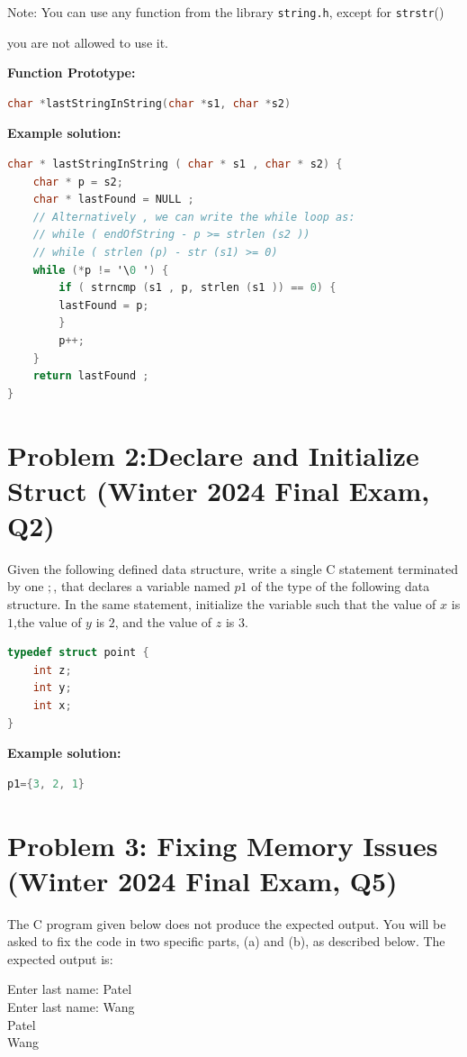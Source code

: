 \documentclass[12pt]{article}
\begin{document}
Note: You can use any function from the library \texttt{string.h}, except for \texttt{strstr}() { you are not allowed to use it.
	
	
\textbf{Function Prototype:}
\begin{lstlisting}[language=C]
char *lastStringInString(char *s1, char *s2) 
\end{lstlisting}
	

\textbf{Example solution:}
\begin{lstlisting}[language=C]
char * lastStringInString ( char * s1 , char * s2) {
	char * p = s2;
	char * lastFound = NULL ;
	// Alternatively , we can write the while loop as:
	// while ( endOfString - p >= strlen (s2 ))
	// while ( strlen (p) - str (s1) >= 0)
	while (*p != '\0 ') {
		if ( strncmp (s1 , p, strlen (s1 )) == 0) {
		lastFound = p;
		}
		p++;
	}
	return lastFound ;
}
\end{lstlisting}

\section*{Problem 2:Declare and Initialize Struct (Winter 2024  Final Exam, Q2)}
Given the following defined data structure, write a single C statement terminated by one $;$, that declares a variable named $p1$ of the type of the following data structure. In the same statement, initialize the variable such that the value of $x$ is $1$,the value of  $y$ is $2$, and the value of $z$ is $3$.

\begin{lstlisting}[language=C]
typedef struct point {
	int z;
	int y;
	int x;
}
\end{lstlisting}

\textbf{Example solution:}
\begin{lstlisting}[language=C]
p1={3, 2, 1}
\end{lstlisting}

\section*{Problem 3: Fixing Memory Issues (Winter 2024 Final Exam, Q5)}
The C program given below does not produce the expected output. You will be asked to fix the code in two specific parts, (a) and (b), as described below. The expected output is:

\begin{tcolorbox}[colback=gray!10, boxrule=0pt, sharp corners, enhanced jigsaw, left=3mm, right=3mm, top=1mm, bottom=1mm]
Enter last name: Patel\\
Enter last name: Wang\\
Patel\\
Wang\\
\end{tcolorbox}

}
\end{document}
